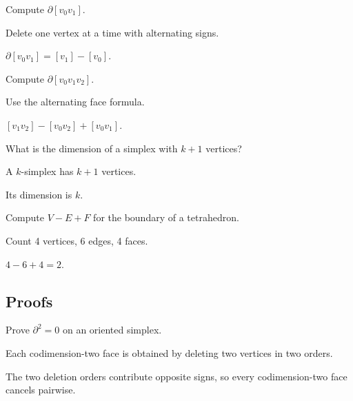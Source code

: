 \begin{exercise}\label{exr:viii15-ped-02}
Compute $\partial[v_0v_1]$.
\end{exercise}
\begin{hint}
Delete one vertex at a time with alternating signs.
\end{hint}
\begin{solution}
$\partial[v_0v_1]=[v_1]-[v_0]$.
\end{solution}

\begin{exercise}\label{exr:viii15-ped-03}
Compute $\partial[v_0v_1v_2]$.
\end{exercise}
\begin{hint}
Use the alternating face formula.
\end{hint}
\begin{solution}
$[v_1v_2]-[v_0v_2]+[v_0v_1]$.
\end{solution}

\begin{exercise}[Dimension]\label{exr:viii15-ped-04}
What is the dimension of a simplex with $k+1$ vertices?
\end{exercise}
\begin{hint}
A $k$-simplex has $k+1$ vertices.
\end{hint}
\begin{solution}
Its dimension is $k$.
\end{solution}

\begin{exercise}\label{exr:viii15-ped-05}
Compute $V-E+F$ for the boundary of a tetrahedron.
\end{exercise}
\begin{hint}
Count 4 vertices, 6 edges, 4 faces.
\end{hint}
\begin{solution}
$4-6+4=2$.
\end{solution}

\subsection*{Proofs}

\begin{exercise}\label{exr:viii15-ped-06}
Prove $\partial^2=0$ on an oriented simplex.
\end{exercise}
\begin{hint}
Each codimension-two face is obtained by deleting two vertices in two orders.
\end{hint}
\begin{solution}
The two deletion orders contribute opposite signs, so every codimension-two face cancels pairwise.
\end{solution}

